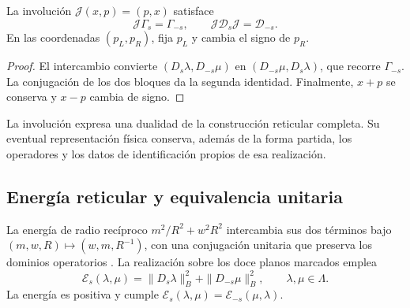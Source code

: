 \begin{proposition}
\label{prop:leech-split-involution}
La involución \(\mathcal J(x,p)=(p,x)\) satisface
\[
 \mathcal J\Gamma_s=\Gamma_{-s},\qquad
 \mathcal J\mathcal D_s\mathcal J=\mathcal D_{-s}.
\]
En las coordenadas \((p_L,p_R)\), fija \(p_L\) y cambia el signo
de \(p_R\).
\end{proposition}
\begin{proof}
El intercambio convierte
\((D_s\lambda,D_{-s}\mu)\) en
\((D_{-s}\mu,D_s\lambda)\), que recorre \(\Gamma_{-s}\).
La conjugación de los dos bloques da la segunda identidad.
Finalmente, \(x+p\) se conserva y \(x-p\) cambia de signo.
\end{proof}

La involución expresa una dualidad de la construcción reticular
completa. Su eventual representación física conserva, además de
la forma partida, los operadores y los datos de identificación
propios de esa realización.

\subsection{Energía reticular y equivalencia unitaria}
\label{subsec:leech-energy}

La energía de radio recíproco
\(m^2/R^2+w^2R^2\) intercambia sus dos términos bajo
\((m,w,R)\mapsto(w,m,R^{-1})\), con una conjugación unitaria
que preserva los dominios operatorios \cite{HMT-IV}.
La realización sobre los doce planos marcados emplea
\begin{equation}
 \mathcal E_s(\lambda,\mu)=
       \|D_s\lambda\|_B^2+\|D_{-s}\mu\|_B^2,
 \qquad \lambda,\mu\in\Lambda.
 \label{eq:leech-energy}
\end{equation}
La energía es positiva y cumple
\(\mathcal E_s(\lambda,\mu)=\mathcal E_{-s}(\mu,\lambda)\).

